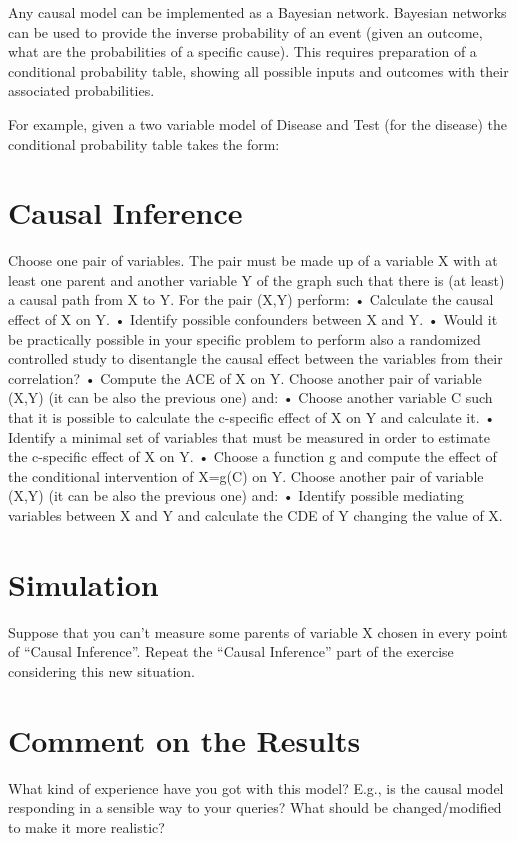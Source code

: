 \documentclass[a4paper,12pt]{article} %
\begin{document}
Any causal model can be implemented as a Bayesian network. Bayesian networks can be used to provide the inverse probability of an event (given an outcome, what are the probabilities of a specific cause). This requires preparation of a conditional probability table, showing all possible inputs and outcomes with their associated probabilities.

For example, given a two variable model of Disease and Test (for the disease) the conditional probability table takes the form:

\section{Causal Inference}

Choose one pair of variables. The pair must be made up of a variable X with at least one parent and another variable Y of the graph such that there is (at least) a causal path from X to Y.
For the pair (X,Y) perform:
• Calculate the causal effect of X on Y.
• Identify possible confounders between X and Y.
• Would it be practically possible in your specific problem to perform also a randomized controlled study to disentangle the causal effect between the variables from their correlation?
• Compute the ACE of X on Y.
Choose another pair of variable (X,Y) (it can be also the previous one) and:
• Choose another variable C such that it is possible to calculate the c-specific effect of X on Y and calculate it.
• Identify a minimal set of variables that must be measured in order to estimate the c-specific effect of X on Y.
• Choose a function g and compute the effect of the conditional intervention of X=g(C) on Y.
Choose another pair of variable (X,Y) (it can be also the previous one) and:
• Identify possible mediating variables between X and Y and calculate the CDE of Y changing the value of X.

\section{Simulation}
Suppose that you can’t measure some parents of variable X chosen in every point of “Causal Inference”.
Repeat the “Causal Inference” part of the exercise considering this new situation.

\section{Comment on the Results}
What kind of experience have you got with this model? E.g., is the causal model responding in a sensible way to your queries? What should be changed/modified to make it more realistic?
\end{document}
